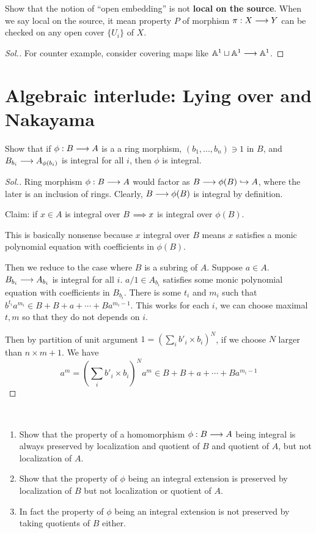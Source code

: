 \documentclass[11pt]{book} %
\begin{document}
\begin{exr}
Show that the notion of ``open embedding'' is not \textbf{local on the source}. When we say local on the source, it mean property $P$ of morphism $\pi:X\longrightarrow Y$ can be checked on any open cover $\{U_i\}$ of $X$.
\end{exr}
\begin{proof}[Sol.]
For counter example, consider covering maps like $\mathbb A^1\sqcup \mathbb A^1\longrightarrow \mathbb A^1$.
\end{proof}
\section{Algebraic interlude: Lying over and Nakayama}
\begin{exr}\label{chap7exr:integral_affine-local_on_target}
Show that if $\phi:B\longrightarrow A$ is a a ring morphism, $(b_1,...,b_n)\ni 1$ in $B$, and $B_{b_i}\longrightarrow A_{\phi(b_i)}$ is integral for all $i$, then $\phi$ is integral.
\end{exr}
\begin{proof}[Sol.]
Ring morphism $\phi:B\longrightarrow A$ would factor as $B\longrightarrow \phi(B)\hookrightarrow A$, where the later is an inclusion of rings. Clearly, $B\longrightarrow \phi(B)$ is integral by definition. 

Claim: if $x\in A$ is integral over $B$ $\Longrightarrow x$ is integral over $\phi(B)$.

This is basically nonsense because $x$ integral over $B$ means $x$ satisfies a monic polynomial equation with coefficients in $\phi(B)$.

Then we reduce to the case where $B$ is a subring of $A$. Suppose $a\in A$. $B_{b_i}\longrightarrow A_{b_i}$ is integral for all $i$. $a/1\in A_{b_i}$ satisfies some monic polynomial equation with coefficients in $B_{b_i}$. There is some $t_i$ and $m_i$ such that $b^{t_i}a^{m_i}\in B+B+a+\cdots +Ba^{m_i-1}$. This works for each $i$, we can choose maximal $t,m$ so that they do not depends on $i$.

Then by partition of unit argument $1=(\sum_i b'_i\times b_i)^N $, if we choose $N$ larger than $n\times m+1$. We have
$$
a^m=(\sum_i b'_i\times b_i)^Na^m\in B+B+a+\cdots +Ba^{m_i-1} 
$$
 \end{proof}
 \begin{exr}\ 
 \begin{enumerate}[label=(\alph*)]
 \item Show that the property of a homomorphism $\phi:B\longrightarrow A$ being integral is always preserved by localization and quotient of $B$ and quotient of $A$, but not localization of $A$.
 \item Show that the property of $\phi$ being an integral extension is preserved by localization of $B$ but not localization or quotient of $A$.
 \item In fact the property of $\phi$ being an integral extension is not preserved by taking quotients of $B$ either.
\end{enumerate}
 \end{exr}
\end{document}
